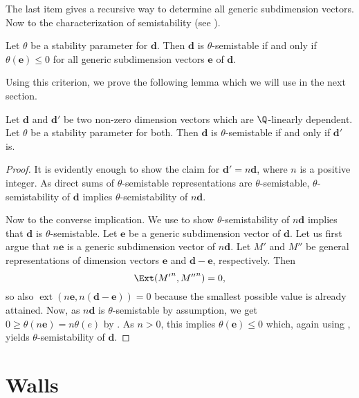 \documentclass[11pt, a4paper]{amsart}
\begin{document}
	The last item gives a recursive way to determine all generic subdimension vectors. Now to the characterization of semistability (see ).
	
	\begin{thm} \label{t:semistable_generic}
		Let $\theta$ be a stability parameter for $\mathbf{d}$. Then $\mathbf{d}$ is $\theta$-semistable if and only if $\theta(\mathbf{e}) \leq 0$ for all generic subdimension vectors $\mathbf{e}$ of $\mathbf{d}$.
	\end{thm}
	
	Using this criterion, we prove the following lemma which we will use in the next section.
	
	\begin{lem} \label{l:semistable_on_ray}
		Let $\mathbf{d}$ and $\mathbf{d}'$ be two non-zero dimension vectors which are $\Q$-linearly dependent. Let $\theta$ be a stability parameter for both. Then $\mathbf{d}$ is $\theta$-semistable if and only if $\mathbf{d}'$ is.
	\end{lem}

	\begin{proof}
		It is evidently enough to show the claim for $\mathbf{d}' = n\mathbf{d}$, where $n$ is a positive integer. As direct sums of $\theta$-semistable representations are $\theta$-semistable, $\theta$-semistability of $\mathbf{d}$ implies $\theta$-semistability of $n\mathbf{d}$. 
		
		Now to the converse implication. We use  to show $\theta$-semistability of $n\mathbf{d}$ implies that $\mathbf{d}$ is $\theta$-semistable. Let $\mathbf{e}$ be a generic subdimension vector of $\mathbf{d}$. Let us first argue that $n\mathbf{e}$ is a generic subdimension vector of $n\mathbf{d}$. Let $M'$ and $M''$ be general representations of dimension vectors $\mathbf{e}$ and $\mathbf{d}-\mathbf{e}$, respectively. Then
		\[
			\Ext({M'}^{n},{M''}^n) = 0,
		\]
		so also $\operatorname{ext}(n\mathbf{e},n(\mathbf{d}-\mathbf{e})) = 0$ because the smallest possible value is already attained. Now, as $n\mathbf{d}$ is $\theta$-semistable by assumption, we get $0 \geq \theta(n\mathbf{e}) = n\theta(e)$ by . As $n > 0$, this implies $\theta(\mathbf{e}) \leq 0$ which, again using , yields $\theta$-semistability of $\mathbf{d}$.
	\end{proof}

	
	\section{Walls}
	
\end{document}
